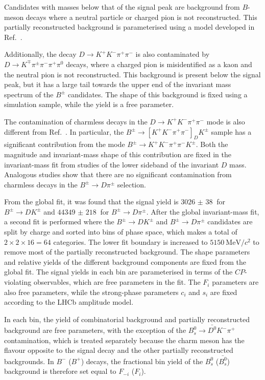 \documentclass[12pt, a4paper, notitlepage, onecolumn]{article}
\begin{document}
Candidates with masses below that of the signal peak are background from $B$-meson decays where a neutral particle or charged pion is not reconstructed. This partially reconstructed background is parameterised using a model developed in Ref.~\cite{LHCb-PAPER-2020-019}.

Additionally, the decay $D\to K^+K^-\pi^+\pi^-$ is also contaminated by $D\to K^\mp\pi^\pm\pi^-\pi^+\pi^0$ decays, where a charged pion is misidentified as a kaon and the neutral pion is not reconstructed. This background is present below the signal peak, but it has a large tail towards the upper end of the invariant mass spectrum of the $B^\pm$ candidates. The shape of this background is fixed using a simulation sample, while the yield is a free parameter.

The contamination of charmless decays in the $D\to K^+K^-\pi^+\pi^-$ mode is also different from Ref.~\cite{LHCb-PAPER-2020-019}. In particular, the $B^\pm\to[K^+K^-\pi^+\pi^-]_DK^\pm$ sample has a significant contribution from the mode $B^\pm\to K^+K^-\pi^+\pi^-K^\pm$. Both the magnitude and invariant-mass shape of this contribution are fixed in the invariant-mass fit from studies of the lower sideband of the invariant $D$ mass. Analogous studies show that there are no significant contamination from charmless decays in the $B^\pm\to D\pi^\pm$ selection.

From the global fit, it was found that the signal yield is $\SI{3026(38)}{}$ for $B^\pm\to DK^\pm$ and $\SI{44349(218)}{}$ for $B^\pm\to D\pi^\pm$. After the global invariant-mass fit, a second fit is performed where the $B^\pm\to DK^\pm$ and $B^\pm\to D\pi^\pm$ candidates are split by charge and sorted into bins of phase space, which makes a total of $2\times 2\times 16 = 64$ categories. The lower fit boundary is increased to $\SI{5150}{\mega\eV/c^2}$ to remove most of the partially reconstructed background. The shape parameters and relative yields of the different background components are fixed from the global fit. The signal yields in each bin are parameterised in terms of the $C\!P$-violating observables, which are free parameters in the fit. The $F_i$ parameters are also free parameters, while the strong-phase parameters $c_i$ and $s_i$ are fixed according to the LHCb amplitude model.

In each bin, the yield of combinatorial background and partially reconstructed background are free parameters, with the exception of the $B^0_s\to\bar{D^0}K^-\pi^+$ contamination, which is treated separately because the charm meson has the flavour opposite to the signal decay and the other partially reconstructed backgrounds. In $B^-$ ($B^+$) decays, the fractional bin yield of the $B^0_s$ ($\bar{B^0_s}$) background is therefore set equal to $F_{-i}$ ($F_i$).
\end{document}
